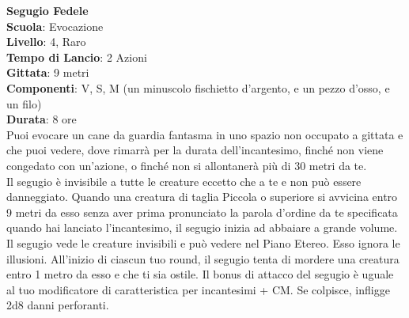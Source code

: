 \begin{multicols}{2}
\medskip\textbf{Segugio Fedele}\\
\textbf{Scuola}: Evocazione\\
\textbf{Livello}: 4, Raro\\
\textbf{Tempo di Lancio}: 2 Azioni\\
\textbf{Gittata}: 9 metri\\
\textbf{Componenti}: V, S, M (un minuscolo fischietto d'argento, e un pezzo d'osso, e un filo)\\
\textbf{Durata}: 8 ore\\
Puoi evocare un cane da guardia fantasma in uno spazio non occupato a gittata e che puoi vedere, dove rimarrà per la durata dell'incantesimo, finché non viene congedato con un'azione, o finché non si allontanerà più di 30 metri da te.\\
Il segugio è invisibile a tutte le creature eccetto che a te e non può essere danneggiato. Quando una creatura di taglia Piccola o superiore si avvicina entro 9 metri da esso senza aver prima pronunciato la parola d'ordine da te specificata quando hai lanciato l'incantesimo, il segugio inizia ad abbaiare a grande volume. Il segugio vede le creature invisibili e può vedere nel Piano Etereo. Esso ignora le illusioni. All'inizio di ciascun tuo round, il segugio tenta di mordere una creatura entro 1 metro da esso e che ti sia ostile. Il bonus di attacco del segugio è uguale al tuo modificatore di caratteristica per incantesimi + CM. Se colpisce, infligge 2d8 danni perforanti.


\end{multicols}

